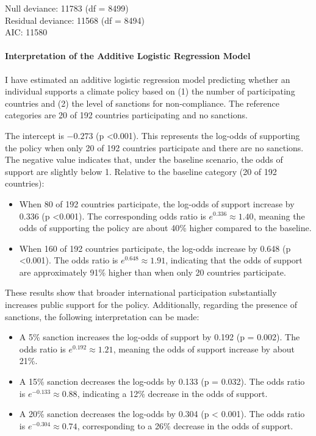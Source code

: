 \documentclass[12pt,letterpaper]{article}
\begin{document}
\vspace{0.3cm}


\noindent
Null deviance: 11783 (df = 8499) \\
Residual deviance: 11568 (df = 8494) \\
AIC: 11580


\paragraph{Interpretation of the Additive Logistic Regression Model}
I have estimated an additive logistic regression model predicting whether an individual supports a climate policy based on (1) the number of participating countries and (2) the level of sanctions for non-compliance. The reference categories are 20 of 192 countries participating and no sanctions.


The intercept is $-0.273$ (p \textless 0.001). This represents the log-odds of supporting the policy when only 20 of 192 countries participate and there are no sanctions. The negative value indicates that, under the baseline scenario, the odds of support are slightly below 1. Relative to the baseline category (20 of 192 countries):

\begin{itemize}
	\item When 80 of 192 countries participate, the log-odds of support increase by 0.336 (p \textless 0.001). The corresponding odds ratio is $e^{0.336} \approx 1.40$, meaning the odds of supporting the policy are about 40\% higher compared to the baseline.
	
	\item When 160 of 192 countries participate, the log-odds increase by 0.648 (p \textless 0.001). The odds ratio is $e^{0.648} \approx 1.91$, indicating that the odds of support are approximately 91\% higher than when only 20 countries participate.
\end{itemize}

These results show that broader international participation substantially increases public support for the policy. Additionally, regarding the presence of sanctions, the following interpretation can be made: 

\begin{itemize}
	\item A 5\% sanction increases the log-odds of support by 0.192 (p = 0.002). The odds ratio is $e^{0.192} \approx 1.21$, meaning the odds of support increase by about 21\%.
	
	\item A 15\% sanction decreases the log-odds by 0.133 (p = 0.032). The odds ratio is $e^{-0.133} \approx 0.88$, indicating a 12\% decrease in the odds of support.
	
	\item A 20\% sanction decreases the log-odds by 0.304 (p < 0.001). The odds ratio is $e^{-0.304} \approx 0.74$, corresponding to a 26\% decrease in the odds of support.
\end{itemize}
\end{document}
